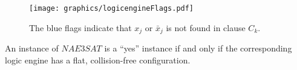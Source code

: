 \begin{figure}[!htbp]
\begin{center}
\texttt{[image: graphics/logicengineFlags.pdf]}
\caption{The blue flags indicate that $x_j$ or $\bar{x}_j$ is not found in clause $C_k$. 
}\label{fig:logicengine-1}
\end{center}
\end{figure}
% 
% 
% 
\begin{thm}\label{thm:Satisfiability-1}
 An instance of $NAE3SAT$ is a ``yes'' instance if and only if the corresponding logic engine has a
flat, collision-free configuration.
\end{thm}
